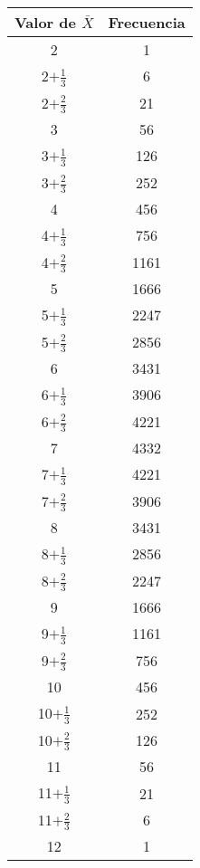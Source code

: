         \begin{center}
        \begin{tabular}{|c|c|}
        \hline
        {\bf Valor de $\bar X$}\rule{0cm}{0.7cm}&{\bf Frecuencia}\\
        \hline
        2& 1 \\ \hline
        2$+\frac{1}{3}$\rule{0cm}{0.35cm}&6 \\ \hline
        2$+\frac{2}{3}$\rule{0cm}{0.35cm}& 21 \\ \hline
        3&56 \\ \hline
        3$+\frac{1}{3}$\rule{0cm}{0.35cm}&126 \\ \hline
        3$+\frac{2}{3}$\rule{0cm}{0.35cm}&252 \\ \hline
        4& 456 \\ \hline
        4$+\frac{1}{3}$\rule{0cm}{0.35cm}&756 \\ \hline
        4$+\frac{2}{3}$\rule{0cm}{0.35cm}& 1161 \\ \hline
        5&1666 \\ \hline
        5$+\frac{1}{3}$\rule{0cm}{0.35cm}&2247 \\ \hline
        5$+\frac{2}{3}$\rule{0cm}{0.35cm}& 2856 \\ \hline
        6&3431 \\ \hline
        6$+\frac{1}{3}$\rule{0cm}{0.35cm}&3906 \\ \hline
        6$+\frac{2}{3}$\rule{0cm}{0.35cm}& 4221 \\ \hline
        7&4332 \\ \hline
        7$+\frac{1}{3}$\rule{0cm}{0.35cm}&4221 \\ \hline
        7$+\frac{2}{3}$\rule{0cm}{0.35cm}& 3906 \\ \hline
        8&3431 \\ \hline
        8$+\frac{1}{3}$\rule{0cm}{0.35cm}& 2856 \\ \hline
        8$+\frac{2}{3}$\rule{0cm}{0.35cm}& 2247 \\ \hline
        9&1666 \\ \hline
        9$+\frac{1}{3}$\rule{0cm}{0.35cm}& 1161 \\ \hline
        9$+\frac{2}{3}$\rule{0cm}{0.35cm}&756 \\ \hline
        10&456 \\ \hline
        10$+\frac{1}{3}$\rule{0cm}{0.35cm}&252 \\ \hline
        10$+\frac{2}{3}$\rule{0cm}{0.35cm}&126 \\ \hline
        11& 56 \\ \hline
        11$+\frac{1}{3}$\rule{0cm}{0.35cm}& 21 \\ \hline
        11$+\frac{2}{3}$\rule{0cm}{0.35cm}&6 \\ \hline
        12&1 \\ \hline
        \end{tabular}
        \end{center}


